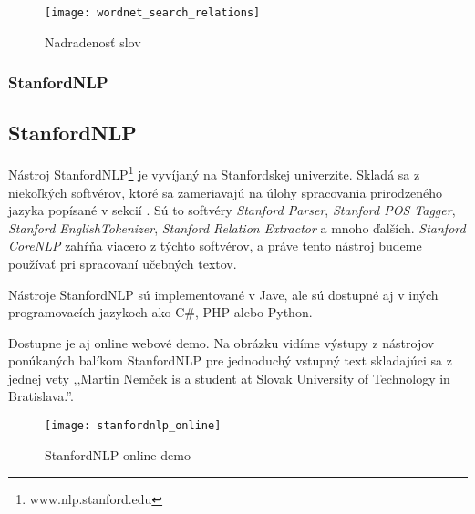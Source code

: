 \begin{figure}[H]
\begin{center}\texttt{[image: wordnet\_search\_relations]}\end{center}
\caption[Nadradenosť slov]{Nadradenosť slov}\label{fig:wordnet_relations}
\end{figure}

%
%
{
	\subsubsection{StanfordNLP}
}
{
	\subsection{StanfordNLP}
}
\label{subsubsec:stanfordnlp}
Nástroj StanfordNLP\footnote{www.nlp.stanford.edu} je vyvíjaný na Stanfordskej univerzite. Skladá sa z niekoľkých softvérov, ktoré sa zameriavajú na úlohy spracovania prirodzeného jazyka popísané v sekcií . Sú to softvéry \textit{Stanford Parser}, \textit{Stanford POS Tagger}, \textit{Stanford EnglishTokenizer}, \textit{Stanford Relation Extractor} a mnoho ďalších. \textit{Stanford CoreNLP} zahŕňa viacero z týchto softvérov, a práve tento nástroj budeme používať pri spracovaní učebných textov.

Nástroje StanfordNLP sú implementované v Jave, ale sú dostupné aj v iných programovacích jazykoch ako C\#, PHP alebo Python.

Dostupne je aj online webové demo. Na obrázku  vidíme výstupy z nástrojov ponúkaných balíkom StanfordNLP pre jednoduchý vstupný text skladajúci sa z jednej vety ,,Martin Nemček is a student at Slovak University of Technology in Bratislava.''.

\begin{figure}[H]
\begin{center}\texttt{[image: stanfordnlp\_online]}\end{center}
\caption[StanfordNLP online demo]{StanfordNLP online demo}\label{fig:stanfordnlp_online_demo}
\end{figure}

